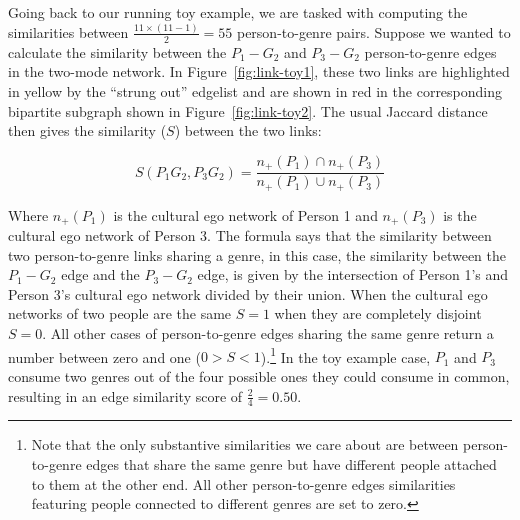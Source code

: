 \documentclass[a4paper,12pt]{extarticle}
\begin{document}
Going back to our running toy example, we are tasked with computing the similarities between $\frac{11 \times (11-1)}{2} = 55$ person-to-genre pairs. Suppose we wanted to calculate the similarity between the $P_1-G_2$ and $P_3-G_2$ person-to-genre edges in the two-mode network. In Figure~\ref{fig:link-toy1}, these two links are highlighted in yellow by the ``strung out'' edgelist and are shown in red in the corresponding bipartite subgraph shown in Figure~\ref{fig:link-toy2}. The usual Jaccard distance then gives the similarity ($S$) between the two links:

\begin{equation}
    S(P_1G_2, P_3G_2) = \frac{n_+(P_1) \cap n_+(P_3)}{n_+(P_1) \cup n_+(P_3)}
\end{equation}

Where $n_+(P_1)$ is the cultural ego network of Person 1 and $n_+(P_3)$ is the cultural ego network of Person 3. The formula says that the similarity between two person-to-genre links sharing a genre, in this case, the similarity between the $P_1-G_2$ edge and the $P_3-G_2$ edge, is given by the intersection of Person 1's and Person 3's cultural ego network divided by their union. When the cultural ego networks of two people are the same $S=1$ when they are completely disjoint $S = 0$. All other cases of person-to-genre edges sharing the same genre return a number between zero and one ($0 > S < 1$).\footnote{Note that the only substantive similarities we care about are between person-to-genre edges that share the same genre but have different people attached to them at the other end. All other person-to-genre edges similarities featuring people connected to different genres are set to zero.} In the toy example case, $P_1$ and $P_3$ consume two genres out of the four possible ones they could consume in common, resulting in an edge similarity score of $\frac{2}{4} = 0.50$. 
\end{document}
